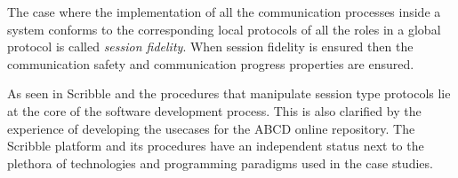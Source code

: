The case where the implementation of all the communication
processes inside a system conforms to the corresponding
local protocols of all the roles in a global protocol 
is called {\em session fidelity}.
When session fidelity is ensured then the communication safety
and communication progress properties are ensured.
%	

As seen in  Scribble and the procedures
that manipulate session type protocols lie at the core
of the software development process. This is also clarified
by the experience of developing the usecases for the ABCD
online repository. The Scribble platform and its procedures
have an independent status next to the plethora of technologies and
programming paradigms used in the case studies.

%


